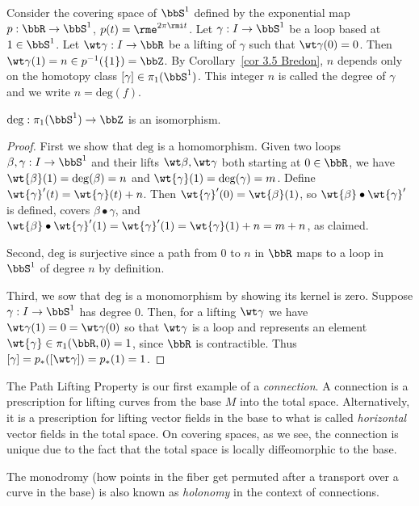 \begin{defn}
    Consider the covering space of $\bbS^1$ defined by the exponential map $p:\bbR \to \bbS^1$, $p(t)=\rme^{2\pi\rmi t}$. Let $\gamma :I\to \bbS^1$ be a loop based at $1\in \bbS^1$. Let $\wt\gamma :I\to \bbR $ be a lifting of $\gamma$ such that $\wt\gamma(0)=0$. Then $\wt\gamma(1)=n\in p^{-1}(\{1\})=\bbZ$. By Corollary~\ref{cor 3.5 Bredon}, $n$ depends only on the homotopy class $[\gamma]\in\pi_1(\bbS^1)$. This integer $n$ is called the degree of $\gamma$ and we write $n=\mathrm{deg}(f)$.
\end{defn}
\begin{thm}\label{pi_1 of the circle thm}
    $\mathrm{deg}: \pi_1(\bbS^1)\to \bbZ$ is an isomorphism.
\end{thm}
\begin{proof}
    First we show that $\mathrm{deg}$ is a homomorphism. Given two loops $\beta,\gamma:I\to \bbS^1$ and their lifts $\wt \beta,\wt\gamma$ both starting at $0\in\bbR $, we have $\wt{\beta}(1)=\mathrm{deg}(\beta)=n$ and  $\wt{\gamma}(1)=\mathrm{deg}(\gamma)=m$. Define $\wt{\gamma}'(t)=\wt{\gamma}(t)+n$. Then $\wt{\gamma}'(0)=\wt{\beta}(1)$, so $\wt{\beta}\bullet \wt{\gamma}'$ is defined, covers $\beta\bullet\gamma$, and $\wt{\beta}\bullet \wt{\gamma}'(1)=\wt{\gamma}'(1)=\wt{\gamma}(1)+n=m+n$, as claimed.

    Second, $\mathrm{deg}$ is surjective since a path from $0$ to $n$ in $\bbR $ maps to a loop in $\bbS^1$ of degree $n$ by definition.

    Third, we sow that $\mathrm{deg}$ is a monomorphism by showing its kernel is zero. Suppose $\gamma:I\to \bbS^1$ has degree $0$. Then, for a lifting $\wt\gamma$ we have $\wt\gamma(1)=0=\wt\gamma(0)$ so that $\wt\gamma$ is a loop and represents an element $\wt{\gamma}\in\pi_1(\bbR ,0)=1$, since $\bbR $ is contractible. Thus $[\gamma]=p_\ast([\wt\gamma])=p_\ast (1)=1$.
\end{proof}


\begin{rem}\label{covering spaces and connections}
	The Path Lifting Property is our first example of a \emph{connection}. A connection is a prescription for lifting curves from the base $M$ into the total space. Alternatively, it is a prescription for lifting vector fields in the base to what is called \emph{horizontal} vector fields in the total space. On covering spaces, as we see, the connection is unique due to the fact that the total space is locally diffeomorphic to the base.
	
	The monodromy (how points in the fiber get permuted after a transport over a curve in the base) is also known as \emph{holonomy} in the context of connections.
\end{rem}


